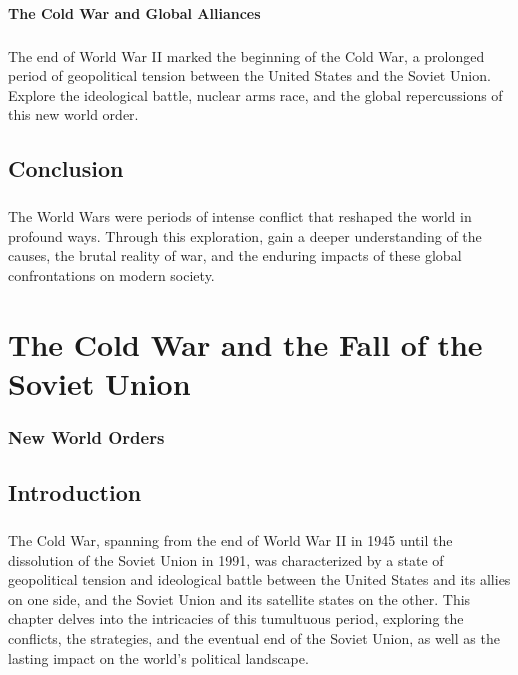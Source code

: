 \documentclass[a4paper,12pt]{book}
\begin{document}
\subsubsection*{The Cold War and Global Alliances}
\paragraph{}
The end of World War II marked the beginning of the Cold War, a prolonged period of geopolitical tension between the United States and the Soviet Union. Explore the ideological battle, nuclear arms race, and the global repercussions of this new world order.

\section*{Conclusion}
\paragraph{}
The World Wars were periods of intense conflict that reshaped the world in profound ways. Through this exploration, gain a deeper understanding of the causes, the brutal reality of war, and the enduring impacts of these global confrontations on modern society.

\chapter{The Cold War and the Fall of the Soviet Union}
\subsection*{New World Orders}

\section*{Introduction}
\paragraph{}
The Cold War, spanning from the end of World War II in 1945 until the dissolution of the Soviet Union in 1991, was characterized by a state of geopolitical tension and ideological battle between the United States and its allies on one side, and the Soviet Union and its satellite states on the other. This chapter delves into the intricacies of this tumultuous period, exploring the conflicts, the strategies, and the eventual end of the Soviet Union, as well as the lasting impact on the world’s political landscape.
\end{document}
